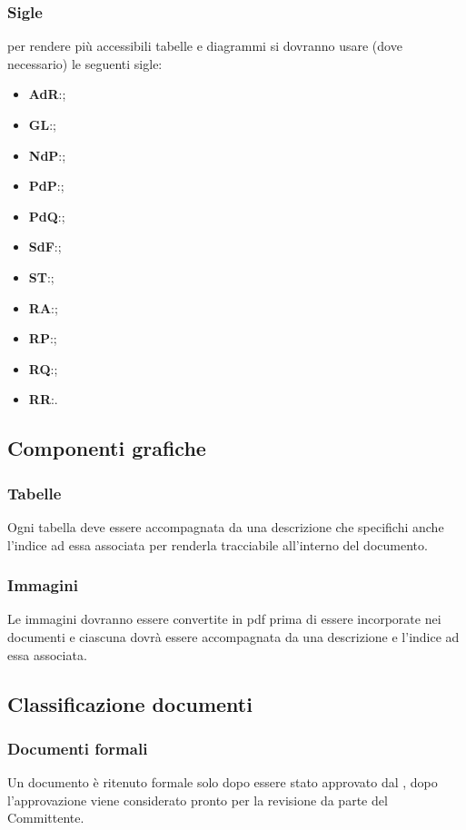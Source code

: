 \documentclass[../NormeDiProgetto.tex]{subfiles}
\begin{document}
		\subsubsection{Sigle}
		per rendere più accessibili tabelle e diagrammi si dovranno usare (dove 
		necessario) le seguenti sigle:
		\begin{itemize}
			\item \textbf{AdR}:\analisideirequisiti ;
			\item \textbf{GL}:\glossario ;
			\item \textbf{NdP}:\normediprogetto ;
			\item \textbf{PdP}:\pianodiprogetto ;
			\item \textbf{PdQ}:\pianodiqualifica ;
			\item \textbf{SdF}:\normediprogetto ;
			\item \textbf{ST}:\specificatecnica ;
			\item \textbf{RA}:\revisionediaccettazione ;
			\item \textbf{RP}:\revisionediprogettazione ;
			\item \textbf{RQ}:\revisionediqualifica ;
			\item \textbf{RR}:\revisionedeirequisiti .
		\end{itemize}
		\subsection{Componenti grafiche}
		\subsubsection{Tabelle}
		Ogni tabella deve essere accompagnata da una descrizione che specifichi anche l'indice ad essa associata per renderla tracciabile all'interno del documento.
		\subsubsection{Immagini}
		Le immagini dovranno essere convertite in pdf prima di essere incorporate nei documenti e ciascuna dovrà essere accompagnata da una descrizione e l'indice ad essa associata.  
		
		
		\subsection{Classificazione documenti}
		
		\subsubsection{Documenti formali}
		Un documento è ritenuto formale solo dopo essere stato approvato dal \responsabilediprogetto , dopo l'approvazione viene considerato pronto per la revisione da parte del Committente.
\end{document}

